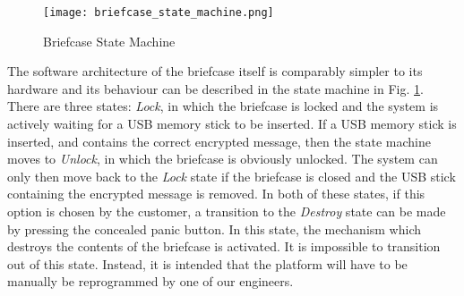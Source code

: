 \begin{figure}[h]
    \centering
    \texttt{[image: briefcase\_state\_machine.png]}
    \caption{Briefcase State Machine}
    \label{fig:briefcase_state_machine}
\end{figure}
The software architecture of the briefcase itself is comparably simpler to its hardware and its behaviour can be described in the state machine in Fig. \ref{fig:briefcase_state_machine}. There are three states: \textit{Lock}, in which the briefcase is locked and the system is actively waiting for a USB memory stick to be inserted. If a USB memory stick is inserted, and contains the correct encrypted message, then the state machine moves to \textit{Unlock}, in which the briefcase is obviously unlocked. The system can only then move back to the \textit{Lock} state if the briefcase is closed and the USB stick containing the encrypted message is removed. In both of these states, if this option is chosen by the customer, a transition to the \textit{Destroy} state can be made by pressing the concealed panic button. In this state, the mechanism which destroys the  contents of the briefcase is activated. It is impossible to transition out of this state. Instead, it is intended that the platform will have to be manually be reprogrammed by one of our engineers. 